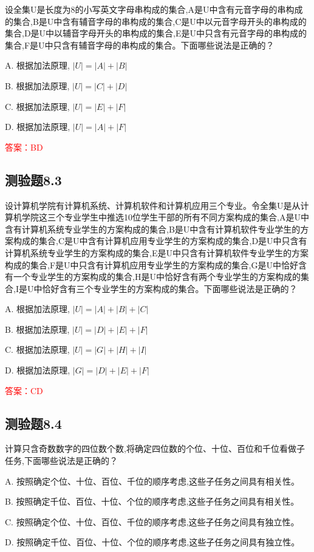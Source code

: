 \documentclass[UTF8, heading=true]{ctexart}
\begin{document}
设全集U是长度为8的小写英文字母串构成的集合,A是U中含有元音字母的串构成的集合,B是U中含有辅音字母的串构成的集合,C是U中以元音字母开头的串构成的集合,D是U中以辅音字母开头的串构成的集合,E是U中只含有元音字母的串构成的集合,F是U中只含有辅音字母的串构成的集合。下面哪些说法是正确的？

A. 根据加法原理, $|U|=|A|+|B|$

B. 根据加法原理, $|U|=|C|+|D|$

C. 根据加法原理, $|U|=|E|+|F|$

D. 根据加法原理, $|U|=|A|+|F|$

\textcolor{red}{答案：BD}

\subsection{测验题8.3}

设计算机学院有计算机系统、计算机软件和计算机应用三个专业。令全集U是从计算机学院这三个专业学生中推选10位学生干部的所有不同方案构成的集合,A是U中含有计算机系统专业学生的方案构成的集合,B是U中含有计算机软件专业学生的方案构成的集合,C是U中含有计算机应用专业学生的方案构成的集合,D是U中只含有计算机系统专业学生的方案构成的集合,E是U中只含有计算机软件专业学生的方案构成的集合,F是U中只含有计算机应用专业学生的方案构成的集合,G是U中恰好含有一个专业学生的方案构成的集合,H是U中恰好含有两个专业学生的方案构成的集合,I是U中恰好含有三个专业学生的方案构成的集合。下面哪些说法是正确的？

A. 根据加法原理, $|U|=|A|+|B|+|C|$

B. 根据加法原理, $|U|=|D|+|E|+|F|$

C. 根据加法原理, $|U|=|G|+|H|+|I|$

D. 根据加法原理, $|G|=|D|+|E|+|F|$

\textcolor{red}{答案：CD}
\subsection{测验题8.4}
计算只含奇数数字的四位数个数,将确定四位数的个位、十位、百位和千位看做子任务,下面哪些说法是正确的？

A. 按照确定个位、十位、百位、千位的顺序考虑,这些子任务之间具有相关性。

B. 按照确定千位、百位、十位、个位的顺序考虑,这些子任务之间具有相关性。

C. 按照确定个位、十位、百位、千位的顺序考虑,这些子任务之间具有独立性。

D. 按照确定千位、百位、十位、个位的顺序考虑,这些子任务之间具有独立性。
\end{document}
